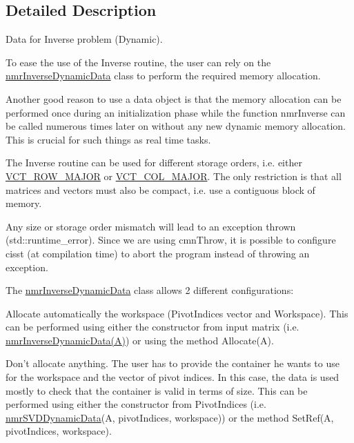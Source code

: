 \subsection{Detailed Description}
Data for Inverse problem (Dynamic). 

To ease the use of the Inverse routine, the user can rely on the \hyperlink{classnmr_inverse_dynamic_data}{nmr\-Inverse\-Dynamic\-Data} class to perform the required memory allocation.

Another good reason to use a data object is that the memory allocation can be performed once during an initialization phase while the function nmr\-Inverse can be called numerous times later on without any new dynamic memory allocation. This is crucial for such things as real time tasks.

The Inverse routine can be used for different storage orders, i.\-e. either \hyperlink{vct_forward_declarations_8h_a45ba752f741240bf765417ebc8130d62}{V\-C\-T\-\_\-\-R\-O\-W\-\_\-\-M\-A\-J\-O\-R} or \hyperlink{vct_forward_declarations_8h_a432cdf8923afaf82f551450ad4034746}{V\-C\-T\-\_\-\-C\-O\-L\-\_\-\-M\-A\-J\-O\-R}. The only restriction is that all matrices and vectors must also be compact, i.\-e. use a contiguous block of memory.

Any size or storage order mismatch will lead to an exception thrown (std\-::runtime\-\_\-error). Since we are using cmn\-Throw, it is possible to configure cisst (at compilation time) to abort the program instead of throwing an exception.

The \hyperlink{classnmr_inverse_dynamic_data}{nmr\-Inverse\-Dynamic\-Data} class allows 2 different configurations\-:


\begin{DoxyItemize}
\item Allocate automatically the workspace (Pivot\-Indices vector and Workspace). This can be performed using either the constructor from input matrix (i.\-e. \hyperlink{classnmr_inverse_dynamic_data}{nmr\-Inverse\-Dynamic\-Data(\-A)}) or using the method Allocate(\-A).
\item Don't allocate anything. The user has to provide the container he wants to use for the workspace and the vector of pivot indices. In this case, the data is used mostly to check that the container is valid in terms of size. This can be performed using either the constructor from Pivot\-Indices (i.\-e. \hyperlink{classnmr_s_v_d_dynamic_data}{nmr\-S\-V\-D\-Dynamic\-Data}(A, pivot\-Indices, workspace)) or the method Set\-Ref(A, pivot\-Indices, workspace).
\end{DoxyItemize}

